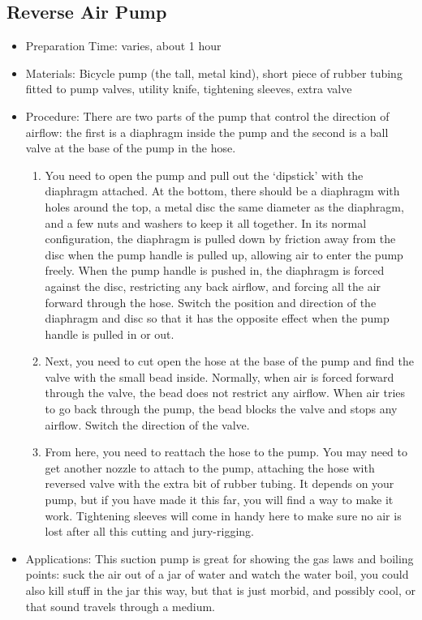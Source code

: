 \subsection{Reverse Air Pump}
\begin{itemize}
\item{Preparation Time: varies, about 1 hour}
\item{Materials: Bicycle pump (the tall, metal kind), short piece of rubber tubing fitted to pump valves, utility knife, tightening sleeves, extra valve}
\item{Procedure: There are two parts of the pump that control the direction of airflow: the first is a diaphragm inside the pump and the second is a ball valve at the base of the pump in the hose.
\begin{enumerate}
\item{You need to open the pump and pull out the ‘dipstick’ with the diaphragm attached. At the bottom, there should be a diaphragm with holes around the top, a metal disc the same diameter as the diaphragm, and a few nuts and washers to keep it all together. In its normal configuration, the diaphragm is pulled down by friction away from the disc when the pump handle is pulled up, allowing air to enter the pump freely. When the pump handle is pushed in, the diaphragm is forced against the disc, restricting any back airflow, and forcing all the air forward through the hose. Switch the position and direction of the diaphragm and disc so that it has the opposite effect when the pump handle is pulled in or out.}
\item{Next, you need to cut open the hose at the base of the pump and find the valve with the small bead inside. Normally, when air is forced forward through the valve, the bead does not restrict any airflow. When air tries to go back through the pump, the bead blocks the valve and stops any airflow. Switch the direction of the valve.}
\item{From here, you need to reattach the hose to the pump. You may need to get another nozzle to attach to the pump, attaching the hose with reversed valve with the extra bit of rubber tubing. It depends on your pump, but if you have made it this far, you will find a way to make it work. Tightening sleeves will come in handy here to make sure no air is lost after all this cutting and jury-rigging.}
\end{enumerate}
} %
\item{Applications: This suction pump is great for showing the gas laws and boiling points: suck the air out of a jar of water and watch the water boil, you could also kill stuff in the jar this way, but that is just morbid, and possibly cool, or that sound travels through a medium.}
\end{itemize}

